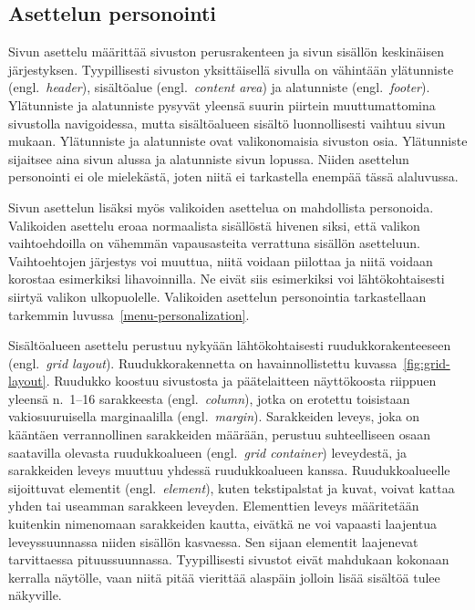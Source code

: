 \documentclass[finnish, 12pt, a4paper, elec, utf8, a-1b]{aaltothesis}
\begin{document}
\subsection{Asettelun personointi}\label{layout-personalization}

Sivun asettelu määrittää sivuston perusrakenteen ja sivun sisällön keskinäisen
järjestyksen. Tyypillisesti sivuston yksittäisellä sivulla on vähintään
ylätunniste (engl.~\textit{header}), sisältöalue (engl.~\textit{content area})
ja alatunniste (engl.~\textit{footer}). Ylätunniste ja alatunniste pysyvät
yleensä suurin piirtein muuttumattomina sivustolla navigoidessa, mutta
sisältöalueen sisältö luonnollisesti vaihtuu sivun mukaan. Ylätunniste ja
alatunniste ovat valikonomaisia sivuston osia. Ylätunniste sijaitsee aina sivun
alussa ja alatunniste sivun lopussa. Niiden asettelun personointi ei ole
mielekästä, joten niitä ei tarkastella enempää tässä alaluvussa.

Sivun asettelun lisäksi myös valikoiden asettelua on mahdollista personoida.
Valikoiden asettelu eroaa normaalista sisällöstä hivenen siksi, että valikon
vaihtoehdoilla on vähemmän vapausasteita verrattuna sisällön asetteluun.
Vaihtoehtojen järjestys voi muuttua, niitä voidaan piilottaa ja niitä voidaan
korostaa esimerkiksi lihavoinnilla. Ne eivät siis esimerkiksi voi
lähtökohtaisesti siirtyä valikon ulkopuolelle. Valikoiden asettelun personointia
tarkastellaan tarkemmin luvussa~\ref{menu-personalization}.

Sisältöalueen asettelu perustuu nykyään lähtökohtaisesti ruudukkorakenteeseen
(engl.~\textit{grid layout}). Ruudukkorakennetta on havainnollistettu
kuvassa~\ref{fig:grid-layout}. Ruudukko koostuu sivustosta ja päätelaitteen
näyttökoosta riippuen yleensä n.~1--16 sarakkeesta (engl.~\textit{column}),
jotka on erotettu toisistaan vakiosuuruisella marginaalilla
(engl.~\textit{margin}). Sarakkeiden leveys, joka on kääntäen verrannollinen
sarakkeiden määrään, perustuu suhteelliseen osaan saatavilla olevasta
ruudukkoalueen (engl.~\textit{grid container}) leveydestä, ja sarakkeiden leveys
muuttuu yhdessä ruudukkoalueen kanssa. Ruudukkoalueelle sijoittuvat elementit
(engl.~\textit{element}), kuten tekstipalstat ja kuvat, voivat kattaa yhden tai
useamman sarakkeen leveyden. Elementtien leveys määritetään kuitenkin nimenomaan
sarakkeiden kautta, eivätkä ne voi vapaasti laajentua leveyssuunnassa niiden
sisällön kasvaessa. Sen sijaan elementit laajenevat tarvittaessa
pituussuunnassa. Tyypillisesti sivustot eivät mahdukaan kokonaan kerralla
näytölle, vaan niitä pitää vierittää alaspäin jolloin lisää sisältöä tulee
näkyville.
\end{document}
